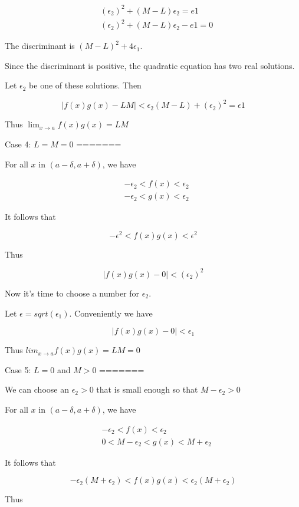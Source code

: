 \begin{align*}
& (\epsilon_2)^2 + (M - L)\epsilon_2 = e1 \\
& (\epsilon_2)^2 + (M - L)\epsilon_2 - e1 = 0 
\end{align*}

The discriminant is $(M - L)^2 + 4\epsilon_1$.

Since the discriminant is positive, the quadratic equation has two real solutions.

Let $\epsilon_2$ be one of these solutions. Then

$$ |f(x)g(x) - LM| < \epsilon_2(M - L) + (\epsilon_2)^2 = \epsilon1 $$

Thus $\lim_{x \rightarrow a} f(x)g(x) = LM$

Case 4: $L = M = 0$
=======

For all $x$ in $(a - \delta, a + \delta)$, we have

\begin{align*}
& -\epsilon_2 < f(x) < \epsilon_2 \\
& -\epsilon_2 < g(x) < \epsilon_2
\end{align*}

It follows that

    $$ -\epsilon^2 < f(x)g(x) < \epsilon^2 $$

Thus

    $$ |f(x)g(x) - 0| < (\epsilon_2)^2 $$

Now it's time to choose a number for $\epsilon_2$.

Let $\epsilon = sqrt(\epsilon_1)$. Conveniently we have

    $$ |f(x)g(x) - 0| < \epsilon_1 $$

Thus $lim_{x \rightarrow a} f(x)g(x) = LM = 0$

Case 5: $L = 0$ and $M > 0$
=======

We can choose an $\epsilon_2 > 0$ that is small enough so that $M - \epsilon_2 > 0$

For all $x$ in $(a - \delta, a + \delta)$, we have

\begin{align*}
& -\epsilon_2 < f(x) < \epsilon_2 \\
& 0 < M - \epsilon_2 < g(x) < M + \epsilon_2
\end{align*}

It follows that

    $$ -\epsilon_2(M + \epsilon_2) < f(x)g(x) < \epsilon_2(M + \epsilon_2) $$

Thus

